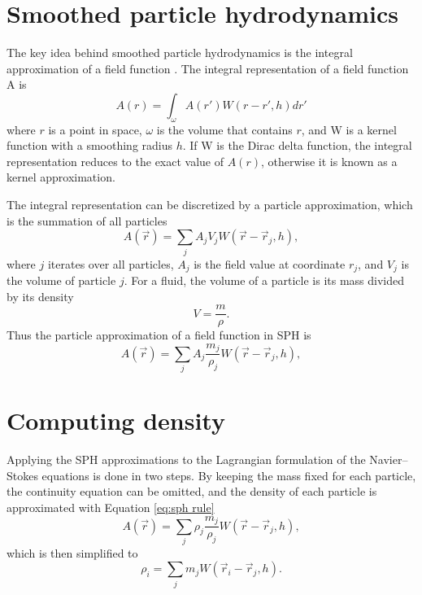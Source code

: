 \documentclass[a4paper, 12pt, oneside]{book}
\begin{document}
\section{Smoothed particle hydrodynamics}
\begin{doublespace}
    The key idea behind smoothed particle hydrodynamics is the integral approximation of a field function \cite{monaghan2005}. The integral representation of a field function A is
    \begin{equation}
        A(r) = \int_{\omega} A(r') W(r - r', h) dr'
    \end{equation}
    where \(r\) is a point in space, \(\omega\) is the volume that contains \(r\), and W is a kernel function with a smoothing radius \(h\). If W is the Dirac delta function, the integral representation reduces to the exact value of \(A(r)\), otherwise it is known as a kernel approximation.
    
    The integral representation can be discretized by a particle approximation, which is the summation of all particles
    \begin{equation}
        A(\vec{r}) = \sum_{j} A_{j} V_{j} W(\vec{r} - \vec{r}_{j}, h) ,
    \end{equation}
    where \(j\) iterates over all particles, \(A_{j}\) is the field value at coordinate \(r_j\), and \(V_j\) is the volume of particle \(j\). For a fluid, the volume of a particle is its mass divided by its density
    \begin{equation}
        V = \frac{m}{\rho}.
    \end{equation}
    Thus the particle approximation of a field function in SPH is
    \begin{equation}
        \label{eq:sph rule}
        A(\vec{r}) = \sum_{j}  A_{j} \frac{m_{j}}{\rho_{j}} W(\vec{r} - \vec{r}_{j}, h) ,
    \end{equation}

\end{doublespace}

\section{Computing density}
\begin{doublespace}
    Applying the SPH approximations to the Lagrangian formulation of the Navier--Stokes equations is done in two steps. By keeping the mass fixed for each particle, the continuity equation can be omitted, and the density of each particle is approximated with Equation \ref{eq:sph rule}
    \begin{equation}
        A(\vec{r}) = \sum_{j}  \rho_{j} \frac{m_{j}}{\rho_{j}} W(\vec{r} - \vec{r}_{j}, h) ,
    \end{equation}
    which is then simplified to
    \begin{equation}
        \label{eq:density}
        \rho_{i} =  \sum_{j} m_{j} W(\vec{r}_{i} - \vec{r}_{j}, h) .
    \end{equation}
\end{doublespace}
\end{document}
